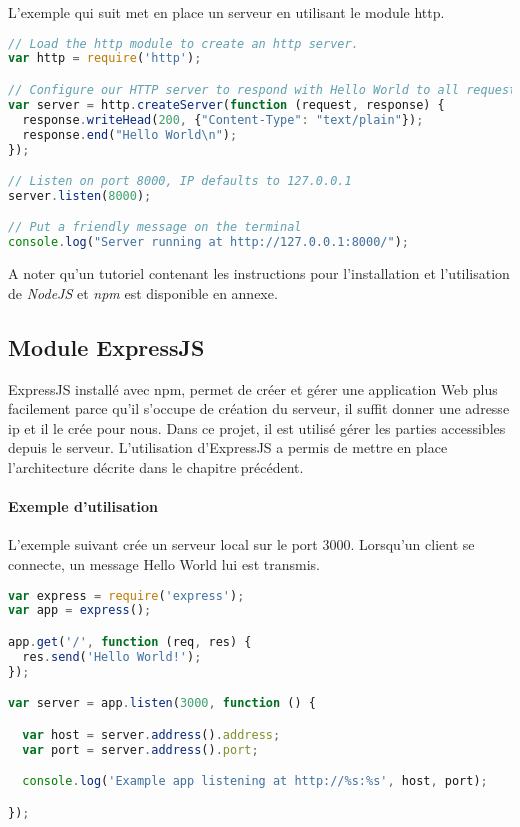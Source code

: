 L'exemple qui suit met en place un serveur en utilisant le module http. 

\lstset{style=mystyle} 
\begin{lstlisting}[language=JavaScript]
// Load the http module to create an http server.
var http = require('http');

// Configure our HTTP server to respond with Hello World to all requests.
var server = http.createServer(function (request, response) {
  response.writeHead(200, {"Content-Type": "text/plain"});
  response.end("Hello World\n");
});

// Listen on port 8000, IP defaults to 127.0.0.1
server.listen(8000);

// Put a friendly message on the terminal
console.log("Server running at http://127.0.0.1:8000/");
\end{lstlisting}


A noter qu'un tutoriel contenant les instructions pour l'installation et l'utilisation de \textit{NodeJS} et \textit{npm} est disponible en annexe.

\subsection{Module ExpressJS}
ExpressJS installé avec npm, permet de créer et gérer une application Web plus facilement parce qu'il s'occupe de création du serveur, il suffit donner une adresse ip et il le crée pour nous. Dans ce projet, il est utilisé gérer les parties accessibles depuis le serveur. L'utilisation d'ExpressJS a permis de mettre en place l'architecture décrite dans le chapitre précédent.\\

\paragraph{Exemple d'utilisation \\}
L'exemple suivant crée un serveur local sur le port 3000. Lorsqu'un client se connecte, un message \textsf{Hello World} lui est transmis.\\

\lstset{style=mystyle} 
\begin{lstlisting}[language=JavaScript]
var express = require('express');
var app = express();

app.get('/', function (req, res) {
  res.send('Hello World!');
});

var server = app.listen(3000, function () {

  var host = server.address().address;
  var port = server.address().port;

  console.log('Example app listening at http://%s:%s', host, port);

});
\end{lstlisting}



